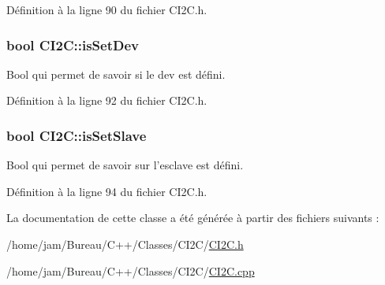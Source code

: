 Définition à la ligne 90 du fichier C\+I2\+C.\+h.

\hypertarget{class_c_i2_c_a892d111f995589334497f2b573ab436d}{
\subsubsection[{is\+Set\+Dev}]{\setlength{\rightskip}{0pt plus 5cm}bool C\+I2\+C\+::is\+Set\+Dev\hspace{0.3cm}{\ttfamily [private]}}}\label{class_c_i2_c_a892d111f995589334497f2b573ab436d}


Bool qui permet de savoir si le dev est défini. 



Définition à la ligne 92 du fichier C\+I2\+C.\+h.

\hypertarget{class_c_i2_c_a19200c12efe17b560256641cce4f5909}{
\subsubsection[{is\+Set\+Slave}]{\setlength{\rightskip}{0pt plus 5cm}bool C\+I2\+C\+::is\+Set\+Slave\hspace{0.3cm}{\ttfamily [private]}}}\label{class_c_i2_c_a19200c12efe17b560256641cce4f5909}


Bool qui permet de savoir sur l'esclave est défini. 



Définition à la ligne 94 du fichier C\+I2\+C.\+h.



La documentation de cette classe a été générée à partir des fichiers suivants \+:\begin{DoxyCompactItemize}
\item 
/home/jam/\+Bureau/\+C++/\+Classes/\+C\+I2\+C/\hyperlink{_c_i2_c_8h}{C\+I2\+C.\+h}\item 
/home/jam/\+Bureau/\+C++/\+Classes/\+C\+I2\+C/\hyperlink{_c_i2_c_8cpp}{C\+I2\+C.\+cpp}\end{DoxyCompactItemize}
